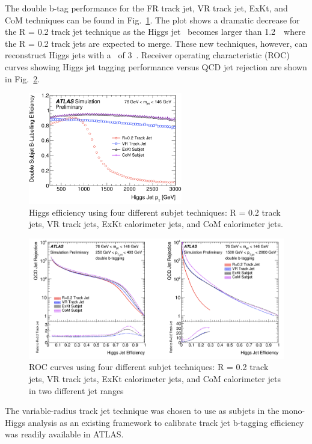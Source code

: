 \par The double b-tag performance for the FR track jet, VR track jet, ExKt, and CoM techniques can be found in Fig.~\ref{fig:higgs_pt}.
The plot shows a dramatic decrease for the R = 0.2 track jet technique as the Higgs jet \pt~becomes larger than 1.2~\TeV~where the 
R = 0.2 track jets are expected to merge. These new techniques, however, can reconstruct Higgs jets with a \pt~of 3~\TeV. Receiver operating characteristic (ROC) curves showing Higgs jet tagging performance versus 
QCD jet rejection are shown in Fig.~\ref{fig:higgs_ROC}.

\begin{figure}[htbp]
    \centering
    \includegraphics[width=0.6\textwidth]{chapters/c5/figures/higgs_pt}
    \caption{Higgs efficiency using four different subjet techniques: R = 0.2 track jets, VR track jets, ExKt calorimeter jets, and CoM calorimeter jets.}
    \label{fig:higgs_pt}
\end{figure}

\begin{figure}[htbp]
    \centering
    \includegraphics[width=1\textwidth]{chapters/c5/figures/higgs_ROC}
    \caption{ROC curves using four different subjet techniques: R = 0.2 track jets, VR track jets, ExKt calorimeter jets, and CoM calorimeter jets in two different jet \pt ranges}
    \label{fig:higgs_ROC}
\end{figure}

\par The variable-radius track jet technique was chosen to use as subjets in the mono-Higgs analysis as an existing framework to calibrate track jet b-tagging efficiency was readily available in ATLAS.

